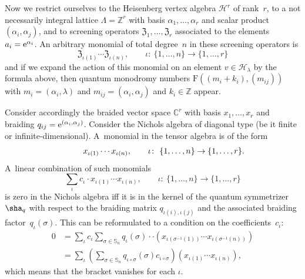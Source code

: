 \documentclass[10pt,a4paper]{amsart}
\numberwithin{equation}{section}
\newcommand{\Z}{\mathbb{Z}}
\newcommand{\C}{\mathbb{C}}
\renewcommand{\S}{\mathbb{S}}
\newcommand{\zem}{\mathfrak{Z}}
\newcommand{\Fp}{\mathrm{F}}
\begin{document}
Now we restrict ourselves to the Heisenberg vertex algebra $\mathcal{H}^r$ of rank~$r$, to a not necessarily integral lattice $\Lambda=\Z^r$ with basis $\alpha_1,\dots, \alpha_r$ and scalar product $(\alpha_i,\alpha_j)$, and to screening operators $\zem_1,\dots,\zem_r$ associated to the elements $a_i={\rm e}^{\alpha_i}$.
An arbitrary monomial of total degree~$n$ in these screening operators is
\[ \zem_{\iota(1)}\cdots \zem_{\iota(n)},\qquad \iota\colon \ \{1,\dots,n\}\to \{1,\dots,r\}\]
and if we expand the action of this monomial on an element $v\in \mathcal{H}_\lambda$ by the formula above, then quantum monodromy numbers $\Fp((m_i+k_i),(m_{ij}))$ with $m_i=(\alpha_i,\lambda)$ and $m_{ij}=(\alpha_i,\alpha_j)$ and $k_i\in \Z$ appear.

Consider accordingly the braided vector space $\C^r$ with basis $x_1,\dots, x_r$ and braiding $q_{ij}={\rm e}^{(\alpha_i,\alpha_j)}$.
Consider the Nichols algebra of diagonal type (be it finite or infinite-dimensional). A~monomial in the tensor algebra is of the form
\[\hphantom{\sum_{\iota} c_\iota\cdot }
x_{\iota(1)}\cdots x_{\iota(n)},\qquad \iota\colon \ \{1,\dots,n\}\to \{1,\dots,r\}.\]
A~linear combination of such monomials
\[\sum_{\iota} c_\iota\cdot x_{\iota(1)}\cdots x_{\iota(n)},\qquad \iota\colon \ \{1,\dots,n\}\to \{1,\dots,r\}\]
is zero in the Nichols algebra iff it is in the kernel of the quantum symmetrizer $\sha_q$ with respect to the braiding matrix $q_{\iota(i),\iota(j)}$ and the associated braiding factor~$q_\iota(\sigma)$. This can be reformulated to a condition on the coefficients~$c_\iota$:
\begin{align*}
0&=\sum_{\iota}c_{\iota}\sum_{\sigma\in\S_n} q_{\iota}(\sigma) \cdot \cdot \left(x_{\iota(\sigma^{-1}(1))} \cdots x_{\iota(\sigma^{-1}(n))}\right)\\
&=\sum_{\iota}\left(\sum_{\sigma\in\S_n} q_{\iota\circ\sigma}(\sigma)c_{\iota\circ\sigma} \right) \left(x_{\iota(1)} \cdots x_{\iota(n)}\right),
\end{align*}
which means that the bracket vanishes for each $\iota$.
\end{document}
